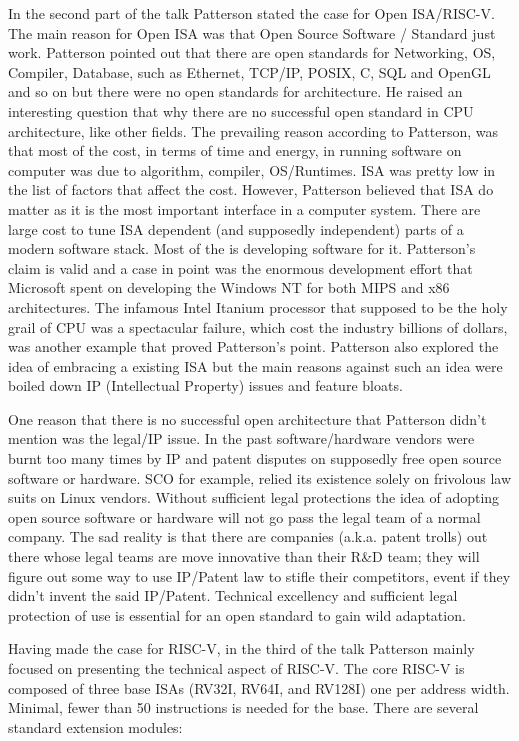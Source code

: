 \documentclass[a4paper, 11pt]{article} %
\begin{document}
In  the second part of the talk Patterson stated the case for Open ISA/RISC-V. The main reason for Open ISA was that Open Source Software / Standard just work. Patterson pointed out that there are open standards for Networking, OS, Compiler, Database, such as Ethernet, TCP/IP, POSIX, C, SQL and OpenGL and so on but there were no open standards for architecture. He raised an interesting question that why there are no successful open standard in CPU architecture, like other fields. The prevailing reason according to Patterson,   was that most of the cost, in terms of time and energy, in running software on computer was due to algorithm, compiler, OS/Runtimes. ISA was pretty low in the list of factors that affect the cost. However, Patterson believed that ISA do matter as it is the most important interface in a computer system. There are large cost to tune ISA dependent (and supposedly independent) parts of a modern software stack. Most of the is developing software for it. Patterson's claim is valid and a case in point was  the enormous development effort that Microsoft spent on developing the Windows NT for both MIPS and x86 architectures. The infamous Intel Itanium processor that supposed to be the holy grail of CPU was a spectacular failure, which cost the industry billions of dollars, was another example that proved Patterson's point.  Patterson also explored the idea of embracing a existing ISA but the main reasons against such an idea were boiled down IP (Intellectual Property) issues and feature bloats. 



One reason that there is no successful open architecture that Patterson didn't mention was the legal/IP issue. In the past software/hardware vendors were burnt too many times by IP and patent disputes on supposedly free open source software or hardware. SCO for example, relied its existence solely on frivolous law suits on Linux vendors. Without sufficient legal protections the idea of adopting open source software or hardware will not go pass the legal team  of a normal company. The sad reality is that there are companies (a.k.a. patent trolls) out there whose legal teams are move innovative than their R\&D team; they will figure out some way to use IP/Patent law to stifle their competitors, event if they didn't invent the said IP/Patent. Technical excellency and sufficient legal protection of use is essential for an open standard to gain wild adaptation.


Having made the case for RISC-V, in the third of the talk Patterson mainly focused on presenting the technical aspect of RISC-V. The core RISC-V is composed of three base ISAs (RV32I, RV64I, and RV128I) one per address width. Minimal, fewer than 50 instructions is  needed for the base. There are several standard extension modules: 
\end{document}
